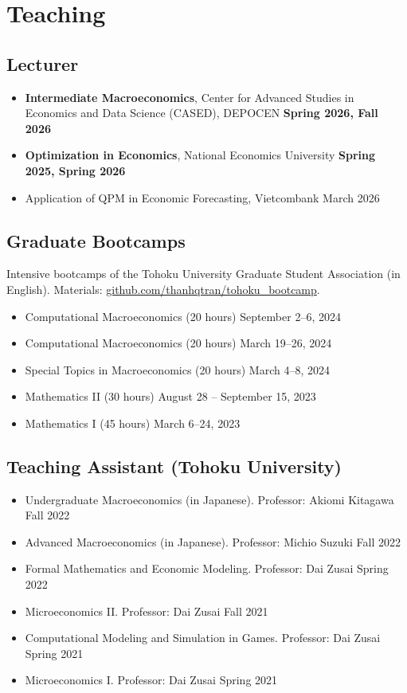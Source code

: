 \documentclass[12pt]{article}
\begin{document}
\section{Teaching}

\subsection{Lecturer}
\begin{itemize}
\item[] \textbf{Intermediate Macroeconomics}, Center for Advanced Studies in Economics and Data Science (CASED), DEPOCEN \hfill \textbf{Spring 2026, Fall 2026}
\item[] \textbf{Optimization in Economics}, National Economics University \hfill \textbf{Spring 2025, Spring 2026}
\item[] Application of QPM in Economic Forecasting, Vietcombank \hfill March 2026
\end{itemize}

\subsection{Graduate Bootcamps}
Intensive bootcamps of the Tohoku University Graduate Student Association (in English). Materials: \href{https://github.com/thanhqtran/tohoku_bootcamp}{github.com/thanhqtran/tohoku\_bootcamp}.
\begin{itemize}
\item[] Computational Macroeconomics (20 hours) \hfill September 2--6, 2024
\item[] Computational Macroeconomics (20 hours) \hfill March 19--26, 2024
\item[] Special Topics in Macroeconomics (20 hours) \hfill March 4--8, 2024
\item[] Mathematics II (30 hours) \hfill August 28 -- September 15, 2023
\item[] Mathematics I (45 hours) \hfill March 6--24, 2023
\end{itemize}

\subsection{Teaching Assistant (Tohoku University)}
\begin{itemize}
\item[] Undergraduate Macroeconomics (in Japanese). Professor: Akiomi Kitagawa \hfill Fall 2022
\item[] Advanced Macroeconomics (in Japanese). Professor: Michio Suzuki \hfill Fall 2022
\item[] Formal Mathematics and Economic Modeling. Professor: Dai Zusai \hfill Spring 2022
\item[] Microeconomics II. Professor: Dai Zusai \hfill Fall 2021
\item[] Computational Modeling and Simulation in Games. Professor: Dai Zusai \hfill Spring 2021
\item[] Microeconomics I. Professor: Dai Zusai \hfill Spring 2021
\end{itemize}
\end{document}
